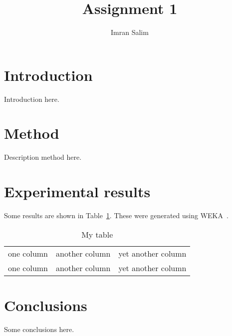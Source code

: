 \documentclass{article}
\begin{document}
\title{Assignment 1}
\author{Imran Salim}

\maketitle

\section{Introduction}

Introduction here.

\section{Method}

Description method here.

\section{Experimental results}

Some results are shown in Table~\ref{table_ref}. These were generated using WEKA~\cite{weka_book}.

\begin{table}[h]
\footnotesize
\center
\begin{tabular}{|c|c|c|}
\hline
one column & another column & yet another column\\
one column & another column & yet another column\\
\hline
\end{tabular}
\caption{My table}
\label{table_ref}
\end{table}

\section{Conclusions}

Some conclusions here.



\end{document}
